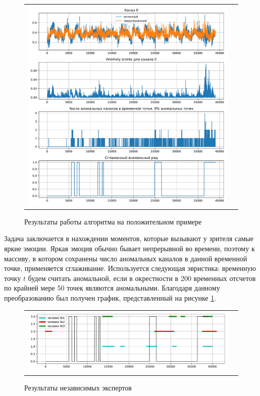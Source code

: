 \documentclass{article}
\begin{document}
\begin{figure}[h]
\begin{tabular}{cc}
  \includegraphics[width=160mm]{9.pdf}
\end{tabular}
\caption{Результаты работы алгоритма на положительном примере}
\label{fig:pos}
\end{figure}

Задача заключается в нахождении моментов, которые вызывают у зрителя самые яркие эмоции. Яркая эмоция обычно бывает непрерывной во времени, поэтому к массиву, в котором сохранены число аномальных каналов в данной временной точке, применяется сглаживание. Используется следующая эвристика: временную точку $t$ будем считать аномальной, если в окрестности в 200 временных отсчетов по крайней мере 50 точек являются аномальными. Благодаря данному преобразованию был получен график, представленный на рисунке \ref{fig:pos}. 

\begin{figure}[h]
\begin{tabular}{cc}
  \includegraphics[width=160mm]{10.pdf}
\end{tabular}
\caption{Результаты независимых экспертов}
\label{fig:experts}
\end{figure}
\end{document}
